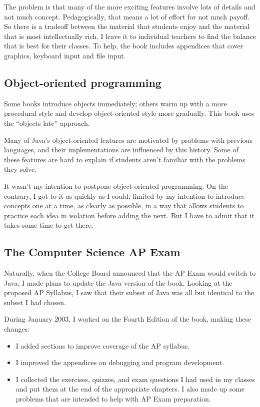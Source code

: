 The problem is that many of the more exciting features involve
lots of details and not much concept.  Pedagogically, that means
a lot of effort for not much payoff.  So there is a tradeoff between
the material that students enjoy and the material that is most
intellectually rich.  I leave it to individual teachers to find
the balance that is best for their classes.  To help, the book
includes appendices that cover graphics, keyboard input and
file input.

\subsection*{Object-oriented programming}

Some books introduce objects immediately; others warm up with a more
procedural style and develop object-oriented style more gradually.
This book uses the ``objects late'' approach.

Many of Java's object-oriented features are motivated
by problems with previous languages, and their implementations
are influenced by this history.  Some of these features are
hard to explain if students aren't familiar with the problems
they solve.

It wasn't my intention to postpone object-oriented programming.
On the contrary, I got to it as quickly as I could, limited by
my intention to introduce concepts one at a time, as clearly
as possible, in a way that allows students to practice each
idea in isolation before adding the next.  But I have to admit
that it takes some time to get there.

\subsection*{The Computer Science AP Exam}

Naturally, when the College Board announced that the AP Exam
would switch to Java, I made plans to update the Java version of
the book.  Looking at the proposed AP Syllabus, I saw that their
subset of Java was all but identical to the subset I had chosen.

During January 2003, I worked on the Fourth Edition of the book,
making these changes:

\begin{itemize}

\item I added sections to improve coverage of the AP syllabus.

\item I improved the appendices on debugging and program development.

\item I collected the exercises, quizzes, and exam questions I
had used in my classes and put them at the end of the appropriate
chapters.  I also made up some problems that are intended to
help with AP Exam preparation.

\end{itemize}

